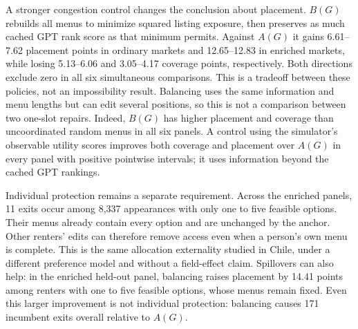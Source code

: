 A stronger congestion control changes the conclusion about placement.
$B(G)$ rebuilds all menus to minimize squared listing exposure, then preserves
as much cached GPT rank score as that minimum permits. Against $A(G)$ it
gains 6.61--7.62 placement points in ordinary markets and 12.65--12.83 in
enriched markets, while losing 5.13--6.06 and 3.05--4.17 coverage points,
respectively. Both directions exclude zero in all six simultaneous comparisons.
This is a tradeoff between these policies, not an impossibility result.
Balancing uses the same information and menu lengths but can edit several
positions, so this is not a comparison between two one-slot repairs.
Indeed, $B(G)$ has higher placement and coverage than uncoordinated random
menus in all six panels.
A control using the simulator's observable utility scores improves both
coverage and placement over $A(G)$ in every panel with positive pointwise
intervals; it uses information beyond the cached GPT rankings.

Individual protection remains a separate requirement. Across the enriched
panels, 11 exits occur among 8,337 appearances with only one to five feasible
options. Their menus already contain every option and are unchanged by the
anchor. Other renters' edits can therefore remove access even when a person's
own menu is complete. This is the same allocation externality studied in
Chile, under a different preference model and without a field-effect claim.
Spillovers can also help: in the enriched held-out panel, balancing raises
placement by 14.41 points among renters with one to five feasible options,
whose menus remain fixed. Even this larger improvement is not individual
protection: balancing causes 171 incumbent exits overall relative to $A(G)$.
